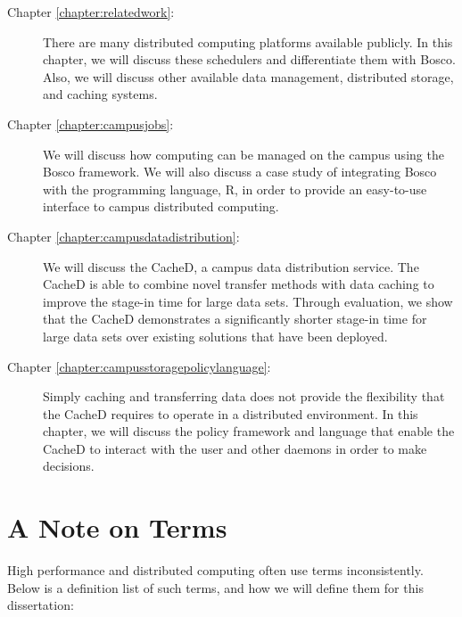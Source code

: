\begin{description}
	\item[Chapter \ref{chapter:relatedwork}:]  There are many distributed computing platforms available publicly.  In this chapter, we will discuss these schedulers and differentiate them with Bosco.  Also, we will discuss other available data management, distributed storage, and caching systems.
	
	\item[Chapter \ref{chapter:campusjobs}:] We will discuss how computing can be managed on the campus using the Bosco framework.  We will also discuss a case study of integrating Bosco with the programming language, R, in order to provide an easy-to-use interface to campus distributed computing.
	
	\item[Chapter \ref{chapter:campusdatadistribution}:] We will discuss the CacheD, a campus data distribution service.  The CacheD is able to combine novel transfer methods with data caching to improve the stage-in time for large data sets.  Through evaluation, we show that the CacheD demonstrates a significantly shorter stage-in time for large data sets over existing solutions that have been deployed.
	
	\item[Chapter \ref{chapter:campusstoragepolicylanguage}:]  
	Simply caching and transferring data does not provide the flexibility that the CacheD requires to operate in a distributed environment.  In this chapter, we will discuss the policy framework and language that enable the CacheD to interact with the user and other daemons in order to make decisions.
\end{description}


\newpage
\section{A Note on Terms}
High performance and distributed computing often use terms inconsistently.  Below is a definition list of such terms, and how we will define them for this dissertation:


